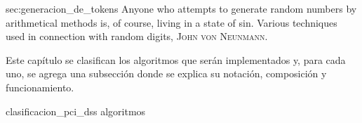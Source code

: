 %
%
%

{sec:generacion_de_tokens}
{
  \epigrafe
  {%
    Anyone who attempts to generate random numbers by arithmetical methods is,
    of course, living in a state of sin.%
  }
  {%
    Various techniques used in connection with random digits,
    \textsc{John von Neunmann}.%
  }
}

\noindent

Este capítulo se clasifican los algoritmos que serán implementados y, para
cada uno, se agrega una subsección donde se explica su notación, composición y
funcionamiento.

{clasificacion_pci_dss}
{algoritmos}
